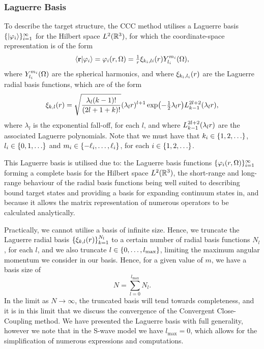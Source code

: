 \documentclass[]{article}
\begin{document}
\subsubsection{Laguerre Basis}
\label{sec:th-ccc-lag}

To describe the target structure, the CCC method utilises a Laguerre basis
$\lbrace\ket{\varphi_{i}}\rbrace_{i = 1}^{\infty}$ for the Hilbert space
$L^{2}(\mathbb{R}^{3})$, for which the coordinate-space representation is of the
form
\begin{equation}
  \label{eq:laguerre-basis}
  \bra{\vb{r}}
  \ket{\varphi_{i}}
  =
  \varphi_{i}(r, \Omega)
  =
  \tfrac{1}{r}
  \xi_{k_{i}, l{i}}(r)
  Y_{l_{i}}^{m_{i}}(\Omega)
  ,
\end{equation}
where $Y_{l_{i}}^{m_{i}}(\Omega)$ are the spherical harmonics, and where
$\xi_{k_{i}, l_{i}}(r)$ are the Laguerre radial basis functions, which are of
the form
\begin{equation}
  \label{eq:laguerre-radial-basis}
  \xi_{k, l}\lr{r}
  =
  \sqrt
  {
    \dfrac
    {
      \lambda_{l}
      \lr{k - 1}!
    }
    {
      \lr{2l + 1 + k}!
    }
  }
  \lr{\lambda_{l} r}^{l + 1}
  \exponential\lr[\big]{- \tfrac{1}{2} \lambda_{l} r}
  L_{k - 1}^{2l + 2}\lr{\lambda_{l} r}
  ,
\end{equation}
where $\lambda_{l}$ is the exponential fall-off, for each $l$, and where
$L_{k - 1}^{2l + 2}(\lambda_{l} r)$ are the associated Laguerre polynomials.
Note that we must have that
$k_{i} \in \lrset{1, 2, \dotsc}$,
$l_{i} \in \lrset{0, 1, \dotsc}$ and
$m_{i} \in \lbrace-\ell_{i}, \dotsc, \ell_{i}\rbrace$, for each
$i \in \lrset{1, 2, \dotsc}$.

This Laguerre basis is utilised due to: the Laguerre basis functions
$\lbrace\varphi_{i}(r, \Omega)\rbrace_{i = 1}^{\infty}$ forming a complete basis
for the Hilbert space $L^{2}(\mathbb{R}^{3})$, the short-range and long-range
behaviour of the radial basis functions being well suited to describing bound
target states and providing a basis for expanding continuum states in, and
because it allows the matrix representation of numerous operators to be
calculated analytically.

Practically, we cannot utilise a basis of infinite size.
Hence, we truncate the Laguerre radial basis
$\lbrace\xi_{k, l}(r)\rbrace_{k = 1}^{N_{l}}$ to a certain number of radial basis
functions $N_{l}$, for each $l$, and we also truncate
$l \in \lbrace0, \dotsc, l_{\max}\rbrace$,
limiting the maximum angular momentum we consider in our basis.
Hence, for a given value of $m$, we have a basis size of
\begin{equation}
  \label{eq:basis-size}
  N
  =
  \sum_{l = 0}^{l_{\max}}
  N_{l}
  .
\end{equation}
In the limit as $N \to \infty$, the truncated basis will tend towards
completeness, and it is in this limit that we discuss the convergence of the
Convergent Close-Coupling method.
We have presented the Laguerre basis with full generality, however we note that
in the S-wave model we have $l_{\max} = 0$, which allows for the simplification
of numerous expressions and computations.
\end{document}
